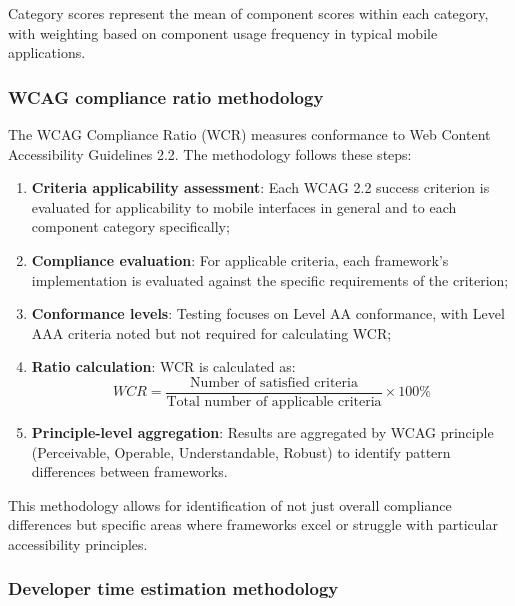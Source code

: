 Category scores represent the mean of component scores within each category, with weighting based on component usage frequency in typical mobile applications.

\subsubsection{WCAG compliance ratio methodology}
\label{subsubsec:wcr-methodology}

The WCAG Compliance Ratio (WCR) measures conformance to Web Content Accessibility Guidelines 2.2. The methodology follows these steps:

\begin{enumerate}
    \item \textbf{Criteria applicability assessment}: Each WCAG 2.2 success criterion is evaluated for applicability to mobile interfaces in general and to each component category specifically;
    
    \item \textbf{Compliance evaluation}: For applicable criteria, each framework's implementation is evaluated against the specific requirements of the criterion;
    
    \item \textbf{Conformance levels}: Testing focuses on Level AA conformance, with Level AAA criteria noted but not required for calculating WCR;
    
    \item \textbf{Ratio calculation}: WCR is calculated as:
    \begin{equation}
    WCR = \frac{\text{Number of satisfied criteria}}{\text{Total number of applicable criteria}} \times 100\%
    \end{equation}
    
    \item \textbf{Principle-level aggregation}: Results are aggregated by WCAG principle (Perceivable, Operable, Understandable, Robust) to identify pattern differences between frameworks.
\end{enumerate}

This methodology allows for identification of not just overall compliance differences but specific areas where frameworks excel or struggle with particular accessibility principles.

\subsubsection{Developer time estimation methodology}
\label{subsubsec:dte-methodology}

